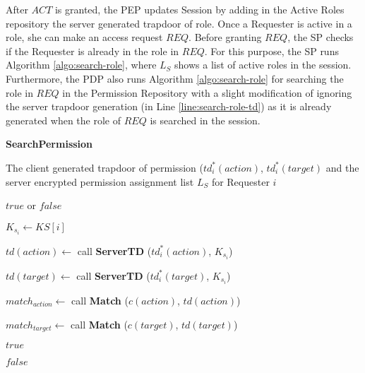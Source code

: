 \documentclass[final,5p,times,twocolumn]{elsarticle}
\newcommand{\algofontsize}{\fontsize{7}{8}\selectfont}
\begin{document}
After $\mathit{ACT}$ is granted, the PEP updates Session by adding in the Active Roles repository the server generated trapdoor of role. Once a Requester is active in a role, she can make an access request $\mathit{REQ}$. Before granting $\mathit{REQ}$, the SP checks if the Requester is already in the role in $\mathit{REQ}$. For this purpose, the SP runs Algorithm \ref{algo:search-role}, where $L_{S}$ shows a list of active roles in the session. Furthermore, the PDP also runs Algorithm \ref{algo:search-role} for searching the role in $\mathit{REQ}$ in the Permission Repository with a slight modification of ignoring the server trapdoor generation (in Line \ref{line:search-role-td}) as it is already generated when the role of $\mathit{REQ}$ is searched in the session.




\begin{algorithm}[htp]
{\algofontsize
\caption{\textbf{SearchPermission}}

\label{algo:search-permission}

\begin{algorithmic}[1]

\REQUIRE The client generated trapdoor of permission ($td^*_i (action)$, $td^*_i (target)$ and the server encrypted permission assignment list $L_{S}$ for Requester $i$

\ENSURE $\mathit{true}$ or $\mathit{false}$

\medskip

\STATE $K_{s_i} \leftarrow KS[i]$ {\algofontsize {}} \label{line:search-permission-ks}

\STATE $td(action) \leftarrow$ call \textbf{ServerTD} ($td^*_i (action)$, $K_{s_i}$) \label{line:search-permission-td-a}

\STATE $td(target) \leftarrow$ call \textbf{ServerTD} ($td^*_i (target)$, $K_{s_i}$) \label{line:search-permission-td-t}

 \label{line:search-permission-loop}

	\STATE $match_{action} \leftarrow$ call \textbf{Match} ($c(action)$, $td(action)$) \label{line:search-permission-match-a}
	
	\STATE $match_{target} \leftarrow$ call \textbf{Match} ($c(target)$, $td(target)$) \label{line:search-permission-match-t}

	 \label{line:search-permission-check-match}
		\RETURN $\mathit{true}$ \label{line:search-permission-true}
	\ENDIF

\ENDFOR

\RETURN $\mathit{false}$ \label{line:search-permission-false}

\end{algorithmic}
}
\end{algorithm}
\end{document}
